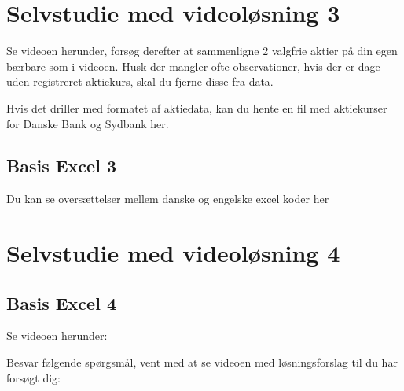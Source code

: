 \documentclass[
]{book}
\begin{document}
\begin{embed-container}

\end{embed-container}

\hypertarget{selvstudie-med-videoluxf8sning-3}{%
\section{Selvstudie med videoløsning 3}\label{selvstudie-med-videoluxf8sning-3}}

Se videoen herunder, forsøg derefter at sammenligne 2 valgfrie aktier på din egen bærbare som i videoen. Husk der mangler ofte observationer, hvis der er dage uden registreret aktiekurs, skal du fjerne disse fra data.

Hvis det driller med formatet af aktiedata, kan du hente en fil med aktiekurser for Danske Bank og Sydbank her.

\hypertarget{basis-excel-3}{%
\subsection{Basis Excel 3}\label{basis-excel-3}}

\begin{embed-container}

\end{embed-container}

Du kan se oversættelser mellem danske og engelske excel koder her

\hypertarget{selvstudie-med-videoluxf8sning-4}{%
\section{Selvstudie med videoløsning 4}\label{selvstudie-med-videoluxf8sning-4}}

\hypertarget{basis-excel-4}{%
\subsection{Basis Excel 4}\label{basis-excel-4}}

Se videoen herunder:

\begin{embed-container}

\end{embed-container}

Besvar følgende spørgsmål, vent med at se videoen med løsningsforslag til du har forsøgt dig:
\end{document}
